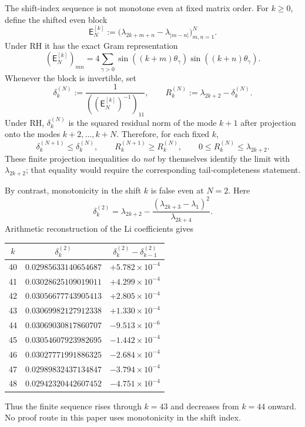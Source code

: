 \documentclass[11pt]{amsart}
\numberwithin{equation}{section}
\theoremstyle{plain}
\theoremstyle{definition}
\theoremstyle{remark}
\newcommand{\E}{\mathsf E}
\begin{document}
The shift-index sequence is not monotone even at fixed matrix order.  For \(k\ge0\), define the shifted even block
\begin{equation}
\E_N^{[k]}:=
\bigl(\lambda_{2k+m+n}-\lambda_{|m-n|}\bigr)_{m,n=1}^N.
\label{eq:shifted_even_block}
\end{equation}
Under RH it has the exact Gram representation
\begin{equation}
(\E_N^{[k]})_{mn}
=4\sum_{\gamma>0}\sin((k+m)\theta_\gamma)\sin((k+n)\theta_\gamma).
\label{eq:shifted_even_gram}
\end{equation}
Whenever the block is invertible, set
\begin{equation}
\delta_k^{(N)}:=\frac{1}{((\E_N^{[k]})^{-1})_{11}},
\qquad
R_k^{(N)}:=\lambda_{2k+2}-\delta_k^{(N)}.
\label{eq:shifted_delta_R}
\end{equation}
Under RH, \(\delta_k^{(N)}\) is the squared residual norm of the mode \(k+1\) after projection
onto the modes \(k+2,\ldots,k+N\).  Therefore, for each fixed \(k\),
\begin{equation}
\delta_k^{(N+1)}\le\delta_k^{(N)},
\qquad
R_k^{(N+1)}\ge R_k^{(N)},
\qquad
0\le R_k^{(N)}\le\lambda_{2k+2}.
\label{eq:shifted_N_monotonicity}
\end{equation}
These finite projection inequalities do \emph{not} by themselves identify the limit with
\(\lambda_{2k+2}\); that equality would require the corresponding tail-completeness statement.

By contrast, monotonicity in the shift \(k\) is false even at \(N=2\).  Here
\begin{equation}
\delta_k^{(2)}
=\lambda_{2k+2}
-\frac{(\lambda_{2k+3}-\lambda_1)^2}{\lambda_{2k+4}}.
\label{eq:shifted_delta_N2_closed}
\end{equation}
Arithmetic reconstruction of the Li coefficients gives
\begin{center}
\small
\begin{tabular}{c@{\qquad}c@{\qquad}c}
\toprule
$k$ & $\delta_k^{(2)}$ & $\delta_k^{(2)}-\delta_{k-1}^{(2)}$\\
\midrule
40 & $0.02985633140654687$ & $+5.782\times10^{-4}$\\
41 & $0.03028625109019011$ & $+4.299\times10^{-4}$\\
42 & $0.03056677743905413$ & $+2.805\times10^{-4}$\\
43 & $0.03069982127912338$ & $+1.330\times10^{-4}$\\
44 & $0.03069030817860707$ & $-9.513\times10^{-6}$\\
45 & $0.03054607923982695$ & $-1.442\times10^{-4}$\\
46 & $0.03027771991886325$ & $-2.684\times10^{-4}$\\
47 & $0.02989832437134847$ & $-3.794\times10^{-4}$\\
48 & $0.02942320442607452$ & $-4.751\times10^{-4}$\\
\bottomrule
\end{tabular}
\end{center}
Thus the finite sequence rises through \(k=43\) and decreases from \(k=44\) onward.  No
proof route in this paper uses monotonicity in the shift index.
\end{document}
